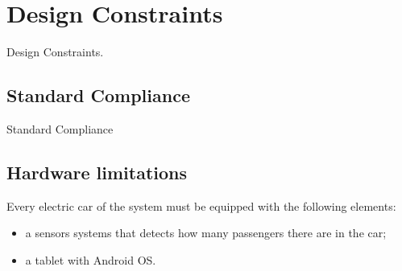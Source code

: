 \section{Design Constraints}
Design Constraints.

\subsection{Standard Compliance}
Standard Compliance

\subsection{Hardware limitations}
Every electric car of the system must be equipped with the following elements:
\begin{itemize}
	\item a sensors systems that detects how many passengers there are in the car;
	\item a tablet with Android OS.
\end{itemize}
